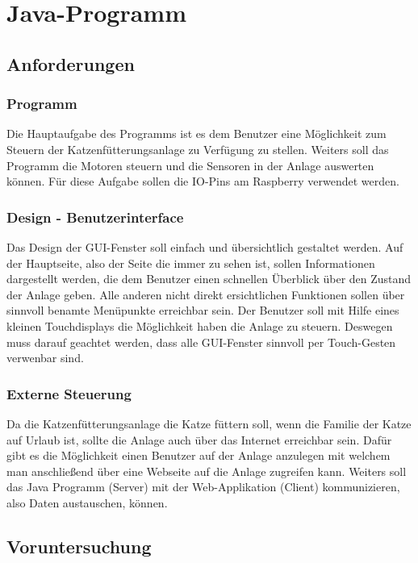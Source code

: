\chapter{Java-Programm}
\label{sec:java-programm}

\section{Anforderungen}
\subsection{Programm}
Die Hauptaufgabe des Programms ist es dem Benutzer eine Möglichkeit zum Steuern der Katzenfütterungsanlage zu Verfügung zu stellen. Weiters soll das Programm die Motoren steuern und die Sensoren in der Anlage auswerten können. Für diese Aufgabe sollen die IO-Pins am Raspberry verwendet werden.
\subsection{Design - Benutzerinterface}
Das Design der GUI-Fenster soll einfach und übersichtlich gestaltet werden. Auf der Hauptseite, also der Seite die immer zu sehen ist, sollen Informationen dargestellt werden, die dem Benutzer einen schnellen Überblick über den Zustand der Anlage geben. Alle anderen nicht direkt ersichtlichen Funktionen sollen über sinnvoll benamte Menüpunkte erreichbar sein.
Der Benutzer soll mit Hilfe eines kleinen Touchdisplays die Möglichkeit haben die Anlage zu steuern. Deswegen muss darauf geachtet werden, dass alle GUI-Fenster sinnvoll per Touch-Gesten verwenbar sind.
\subsection{Externe Steuerung}
Da die Katzenfütterungsanlage die Katze füttern soll, wenn die Familie der Katze auf Urlaub ist, sollte die Anlage auch über das Internet erreichbar sein. Dafür gibt es die Möglichkeit einen Benutzer auf der Anlage anzulegen mit welchem man anschließend über eine Webseite auf die Anlage zugreifen kann. Weiters soll das Java Programm (Server) mit der Web-Applikation (Client) kommunizieren, also Daten austauschen, können.

\newpage

\section{Voruntersuchung}
